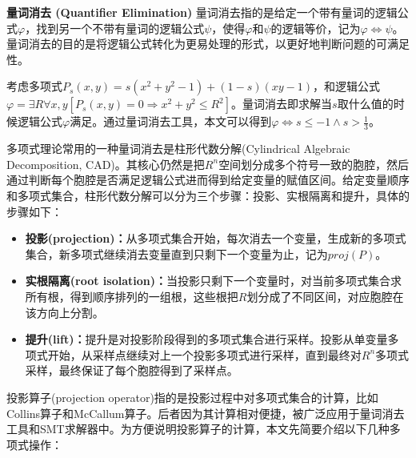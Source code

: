 \begin{definition}{\textbf{量词消去 (Quantifier Elimination)}}
量词消去指的是给定一个带有量词的逻辑公式$\varphi$，找到另一个不带有量词的逻辑公式$\psi$，使得$\varphi$和$\psi$的逻辑等价，记为$\varphi \Leftrightarrow \psi$。量词消去的目的是将逻辑公式转化为更易处理的形式，以更好地判断问题的可满足性。
\end{definition}

\begin{example}
考虑多项式$P_s(x, y) = s(x^2 + y^2 - 1) + (1 - s)(xy - 1)$，和逻辑公式$\varphi = \exists R \forall x, y [P_s(x, y) = 0 \Rightarrow x^2 + y^2 \leq R^2]$。量词消去即求解当$s$取什么值的时候逻辑公式$\varphi$满足。通过量词消去工具，本文可以得到$\varphi \Leftrightarrow s \le -1 \wedge s > \frac{1}{3}$。\label{ex:quantifier_elimination}
\end{example}

多项式理论常用的一种量词消去是柱形代数分解(Cylindrical Algebraic Decomposition, CAD)。其核心仍然是把$R^n$空间划分成多个符号一致的胞腔，然后通过判断每个胞腔是否满足逻辑公式进而得到给定变量的赋值区间。给定变量顺序和多项式集合，柱形代数分解可以分为三个步骤：投影、实根隔离和提升，具体的步骤如下：
\begin{itemize}
    \item \textbf{投影(projection)：}从多项式集合开始，每次消去一个变量，生成新的多项式集合，新多项式继续消去变量直到只剩下一个变量为止，记为$proj(P)$。
    \item \textbf{实根隔离(root isolation)：}当投影只剩下一个变量时，对当前多项式集合求所有根，得到顺序排列的一组根，这些根把$R$划分成了不同区间，对应胞腔在该方向上分割。
    \item \textbf{提升(lift)：}提升是对投影阶段得到的多项式集合进行采样。投影从单变量多项式开始，从采样点继续对上一个投影多项式进行采样，直到最终对$R^n$多项式采样，最终保证了每个胞腔得到了采样点。
\end{itemize}

投影算子(projection operator)指的是投影过程中对多项式集合的计算，比如Collins算子\cite{Collins74}和McCallum算子\cite{McCallum98}。后者因为其计算相对便捷，被广泛应用于量词消去工具和SMT求解器中。为方便说明投影算子的计算，本文先简要介绍以下几种多项式操作：

